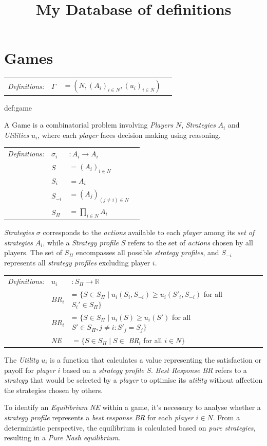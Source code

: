 \documentclass[12pt]{extarticle}
\title{My Database of definitions}
\author{}
\date{}
\newcommand{\definition}[1] {
    \begin{tcolorbox}[colback=mygray,colframe=mygray,sharp corners=all,top=0.01cm,bottom=0.01cm,left=0.1cm]
    \small
    \setlength{\tabcolsep}{2pt}
    \begin{tabular}{l l l l}
        \textit{Definitions:} & #1
    \end{tabular}
    \end{tcolorbox}
}
\begin{document}
\maketitle

\section{Games}

\definition{$\Gamma $&$ = (N,(A_i)_{i \in N}, (u_i)_{i \in N})$}{def:game}

A Game is a combinatorial problem involving \textit{Players} $N$, \textit{Strategies} $A_i$ and \textit{Utilities} $u_i$, where each \textit{player} faces decision making using reasoning.

\definition{
    $\sigma_i $&$: A_i \rightarrow A_i$
    \\ & $S $&$ = (A_i)_{i \in N}$
    \\ & $S_i $&$ = A_i$
    \\ & $S_{-i} $&$ = (A_j)_{(j \neq i) \in N}$
    \\ & $S_\Pi $&$ = \prod_{i \in N}A_i$
}
\textit{Strategies} $\sigma$ corresponds to the \textit{actions} available to each \textit{player} among its \textit{set of strategies} $A_i$, while a \textit{Strategy profile} $S$ refers to the set of \textit{actions} chosen by all players.  The set of $S_\Pi$ encompasses all possible \textit{strategy profiles}, and $S_{-i}$ represents all \textit{strategy profiles} excluding player $i$.

\definition{
    \textit{$u_i$} &$ : S_\Pi \rightarrow \mathbb{R}$
    \\ & $\textit{BR}_i$ &= $\{ S \in S_\Pi \mid u_i(S_i,S_{-i}) \geqslant u_i(S'_i,S_{-i})$ for all  $S_i' \in S_\Pi\}$
    \\ & $\textit{BR}_i$ &= $\{ S \in S_\Pi \mid u_i(S) \geqslant u_i(S')$ for all  $S' \in S_\Pi, j \ne i : S'_j=S_j\}$
    \\ & \textit{NE}    &$= \{ S \in S_\Pi \mid S \in$ \textit{BR}$_i$ for all $i \in N \}$
}
The \textit{Utility} $u_i$ is a function that calculates a value representing the satisfaction or payoff for \textit{player} $i$ based on a \textit{strategy profile} $S$. \textit{Best Response} \textit{BR} refers to a \textit{strategy} that would be selected by a \textit{player} to optimise its \textit{utility} without affection the strategies chosen by others.

To identify an \textit{Equilibrium} \textit{NE} within a game, it’s necessary to analyse whether a \textit{strategy profile} represents a \textit{best response} \textit{BR} for each \textit{player} $i \in N$. From a deterministic perspective, the equilibrium is calculated based on \textit{pure strategies}, resulting in a \textit{Pure Nash equilibrium}.
\end{document}
